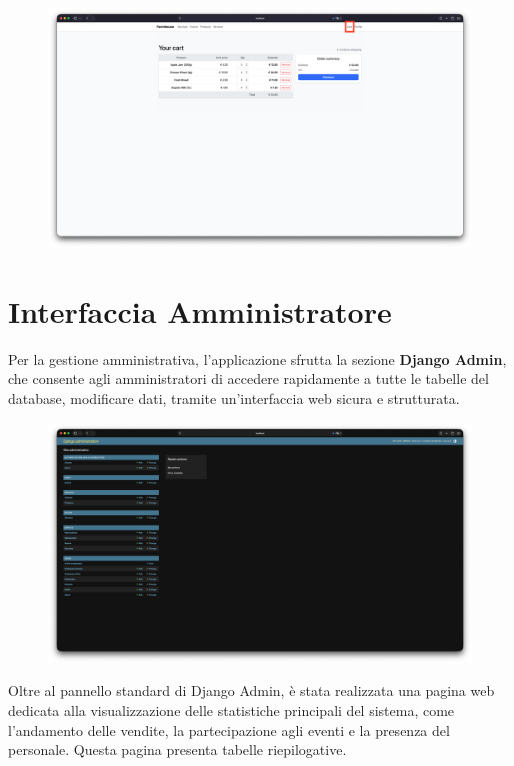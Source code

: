 \documentclass[a4paper,12pt]{report}
\begin{document}
\begin{figure}[H]
    \centering
    \includegraphics[width=\textwidth, trim=0 0 0 0]{./img/users/cart.png}
    \vspace{-1em}
    \label{fig:cart}
\end{figure}


\section{Interfaccia Amministratore}
Per la gestione amministrativa, l'applicazione sfrutta la sezione \textbf{Django Admin}, 
che consente agli amministratori di accedere rapidamente a tutte le tabelle del database, 
modificare dati, tramite un'interfaccia web sicura e strutturata.

\begin{figure}[H]
    \centering
    \includegraphics[width=\textwidth, trim=0 0 0 0]{./img/admin/DjangoAdmin.png}
    \vspace{-1em}
    \label{fig:django-admin}
\end{figure}

Oltre al pannello standard di Django Admin, è stata realizzata una pagina web dedicata alla 
visualizzazione delle statistiche principali del sistema, come l'andamento delle vendite, la 
partecipazione agli eventi e la presenza del personale. Questa pagina presenta tabelle 
riepilogative.
\end{document}
